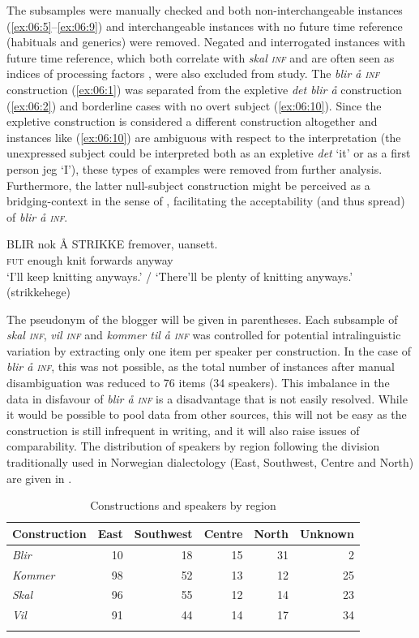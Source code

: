 \documentclass[output=paper,colorlinks,citecolor=brown]{langscibook}
\begin{document}
The subsamples were manually checked and both non-interchangeable instances (\ref{ex:06:5}--\ref{ex:06:9}) and interchangeable instances with no future time reference (habituals and generics) were removed. Negated and interrogated instances with future time reference, which both correlate with \textit{skal \textsc{inf}} and are often seen as indices of processing factors \citep{mikkelsenhartmann2022}, were also excluded from study. The \textit{blir å \textsc{inf}} construction (\ref{ex:06:1}) was separated from the expletive \textit{det blir å} construction (\ref{ex:06:2}) and borderline cases with no overt subject (\ref{ex:06:10}). Since the expletive construction is considered a different construction altogether and instances like (\ref{ex:06:10}) are ambiguous with respect to the interpretation (the unexpressed subject could be interpreted both as an expletive \textit{det} ‘it’ or as a first person jeg ‘I’), these types of examples were removed from further analysis. Furthermore, the latter null-subject construction might be perceived as a bridging-context in the sense of \citet{Heine2002}, facilitating the acceptability (and thus spread) of \textit{blir å \textsc{inf}}.

\ea\label{ex:06:10}
\gll BLIR nok Å STRIKKE fremover, uansett. \\
     \textsc{fut} enough knit forwards anyway\\
\glt ‘I’ll keep knitting anyways.’ / ‘There’ll be plenty of knitting anyways.’ (strikkehege)
\z

The pseudonym of the blogger will be given in parentheses. Each subsample of \textit{skal \textsc{inf}}, \textit{vil \textsc{inf}} and \textit{kommer til å \textsc{inf}} was controlled for potential intralinguistic variation by extracting only one item per speaker per construction. In the case of \textit{blir å \textsc{inf}}, this was not possible, as the total number of instances after manual disambiguation was reduced to 76 items (34 speakers). This imbalance in the data in disfavour of \textit{blir å \textsc{inf}} is a disadvantage that is not easily resolved. While it would be possible to pool data from other sources, this will not be easy as the construction is still infrequent in writing, and it will also raise issues of comparability. The distribution of speakers by region following the division traditionally used in Norwegian dialectology (East, Southwest, Centre and North) are given in .

\begin{table}
\caption{Constructions and speakers by region}
\label{tab:mikk_glynn:regions}
 \begin{tabularx}{.9\textwidth}{p{2.5cm} rrrrr}
  \lsptoprule
Construction & East & Southwest & Centre  & North & Unknown\\
  \midrule
  \textit{Blir}  & 10 & 18 & 15 & 31 & 2\\
  \textit{Kommer}  & 98 & 52 & 13 & 12 & 25\\
  \textit{Skal}  & 96 & 55 & 12 & 14 & 23\\
  \textit{Vil}  & 91 & 44 & 14 & 17 & 34\\
  \lspbottomrule
 \end{tabularx}
\end{table}
\end{document}
